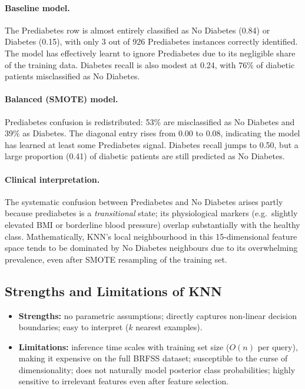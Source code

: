 \documentclass[12pt,a4paper]{article}
\begin{document}
\paragraph{Baseline model.}
The Prediabetes row is almost entirely classified as No Diabetes (0.84) or Diabetes
(0.15), with only 3 out of 926 Prediabetes instances correctly identified.  
The model has effectively learnt to ignore Prediabetes due to its negligible share
of the training data.  Diabetes recall is also modest at 0.24, with 76\% of diabetic
patients misclassified as No Diabetes.

\paragraph{Balanced (SMOTE) model.}
Prediabetes confusion is redistributed: 53\% are misclassified as No Diabetes and
39\% as Diabetes.  The diagonal entry rises from 0.00 to 0.08, indicating the model
has learned at least some Prediabetes signal.  Diabetes recall jumps to 0.50, but
a large proportion (0.41) of diabetic patients are still predicted as No Diabetes.

\paragraph{Clinical interpretation.}
The systematic confusion between Prediabetes and No Diabetes arises partly because
prediabetes is a \emph{transitional} state; its physiological markers (e.g.\ slightly
elevated BMI or borderline blood pressure) overlap substantially with the healthy
class.  Mathematically, KNN's local neighbourhood in this 15-dimensional feature
space tends to be dominated by No Diabetes neighbours due to its overwhelming
prevalence, even after SMOTE resampling of the training set.

\subsection{Strengths and Limitations of KNN}

\begin{itemize}
  \item \textbf{Strengths:} no parametric assumptions; directly captures non-linear
        decision boundaries; easy to interpret ($k$ nearest examples).
  \item \textbf{Limitations:} inference time scales with training set size ($O(n)$
        per query), making it expensive on the full BRFSS dataset;
        susceptible to the curse of dimensionality; does not naturally model
        posterior class probabilities; highly sensitive to irrelevant features even
        after feature selection.
\end{itemize}
\end{document}
